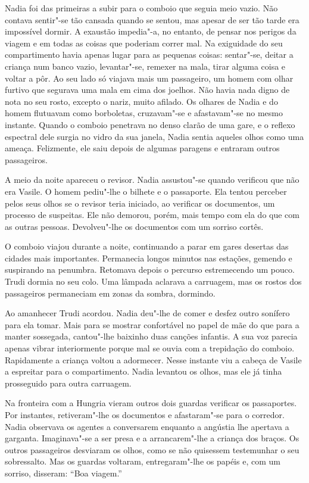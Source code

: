 Nadia foi das primeiras a subir para o comboio que
seguia meio vazio. Não contava sentir"-se tão cansada quando se sentou,
mas apesar de ser tão tarde era impossível dormir. A exaustão
impedia"-a, no entanto, de pensar nos perigos da viagem e em todas as
coisas que poderiam correr mal. Na exiguidade do seu compartimento havia
apenas lugar para as pequenas coisas: sentar"-se, deitar a criança num
banco vazio, levantar"-se, remexer na mala, tirar alguma coisa e voltar a
pôr. Ao seu lado só viajava mais um passageiro, um homem com olhar
furtivo que
segurava uma mala em cima dos joelhos. Não havia nada digno de nota no
seu rosto, excepto o nariz, muito afilado. Os olhares de Nadia e do
homem flutuavam como borboletas, cruzavam"-se e afastavam"-se no mesmo
instante. Quando o comboio penetrava no denso clarão de uma gare, e o
reflexo espectral dele surgia no vidro da sua janela, Nadia sentia
aqueles olhos como uma ameaça. Felizmente, ele saiu depois de algumas
paragens e entraram outros passageiros.

A meio da noite apareceu o revisor. Nadia assustou"-se quando verificou
que não era Vasile. O homem pediu"-lhe o bilhete e o passaporte. Ela
tentou perceber pelos seus olhos se o revisor teria iniciado, ao
verificar os documentos, um processo de suspeitas. Ele não demorou,
porém, mais tempo com ela do que com as outras pessoas. Devolveu"-lhe os
documentos com um sorriso cortês.

O comboio viajou durante a noite, continuando a parar em gares desertas
das cidades mais importantes. Permanecia longos minutos nas estações,
gemendo e suspirando na penumbra. Retomava depois o percurso
estremecendo um pouco. Trudi dormia no seu colo. Uma lâmpada aclarava a
carruagem, mas os rostos dos passageiros permaneciam em zonas da sombra,
dormindo.

Ao amanhecer Trudi acordou. Nadia deu"-lhe de comer e desfez outro
sonífero para ela tomar. Mais para se mostrar confortável no papel de
mãe do que para a manter sossegada, cantou"-lhe baixinho duas canções
infantis. A sua voz parecia apenas vibrar interiormente porque mal se
ouvia com a trepidação do comboio. Rapidamente a criança voltou a
adormecer. Nesse instante viu a cabeça de
Vasile a espreitar para o compartimento. Nadia levantou os olhos, mas
ele já tinha prosseguido para outra carruagem.

Na fronteira com a
Hungria vieram outros dois guardas verificar os passaportes. Por
instantes, retiveram"-lhe os documentos e afastaram"-se para o corredor.
Nadia observava os agentes a conversarem enquanto a angústia lhe
apertava a garganta. Imaginava"-se a ser presa e a arrancarem"-lhe a
criança dos braços. Os outros passageiros desviaram os olhos, como se
não quisessem testemunhar o seu sobressalto. Mas os guardas voltaram,
entregaram"-lhe os
papéis e, com um sorriso, disseram: ``Boa viagem.''

